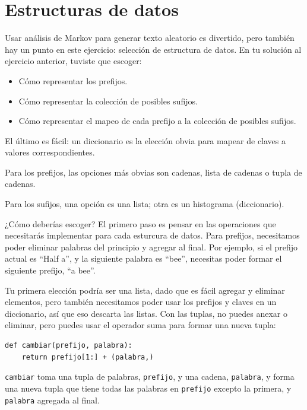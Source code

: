\documentclass[10pt]{book}
\begin{document}
\section{Estructuras de datos}

Usar análisis de Markov para generar texto aleatorio es divertido, pero también
hay un punto en este ejercicio: selección de estructura de datos.  En tu
solución al ejercicio anterior, tuviste que escoger:

\begin{itemize}

\item Cómo representar los prefijos.

\item Cómo representar la colección de posibles sufijos.

\item Cómo representar el mapeo de cada prefijo a
la colección de posibles sufijos.

\end{itemize}

El último es fácil: un diccionario es la elección obvia
para mapear de claves a valores correspondientes.

Para los prefijos, las opciones más obvias son cadenas,
lista de cadenas o tupla de cadenas.

Para los sufijos,
una opción es una lista; otra es un histograma (diccionario).

¿Cómo deberías escoger?  El primero paso es pensar en
las operaciones que necesitarás implementar para cada esturcura de datos.
Para prefijos, necesitamos poder eliminar palabras del
principio y agregar al final.  Por ejemplo, si el prefijo actual
es ``Half a'', y la siguiente palabra es ``bee'', necesitas
poder formar el siguiente prefijo, ``a bee''.

Tu primera elección podría ser una lista, dado que es fácil agregar y
eliminar elementos, pero también necesitamos poder usar los
prefijos y claves en un diccionario, así que eso descarta las listas.
Con las tuplas, no puedes anexar o eliminar, pero puedes usar
el operador suma para formar una nueva tupla:

\begin{verbatim}
def cambiar(prefijo, palabra):
    return prefijo[1:] + (palabra,)
\end{verbatim}
%
{\tt cambiar} toma una tupla de palabras, {\tt prefijo}, y una cadena,
{\tt palabra}, y forma una nueva tupla que tiene todas las palabras
en {\tt prefijo} excepto la primera, y {\tt palabra} agregada al
final.
\end{document}
